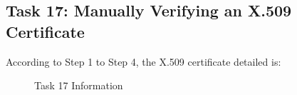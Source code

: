 \documentclass[a4paper]{article}
\begin{document}
\subsection{Task 17: Manually Verifying an X.509 Certificate}
According to Step 1 to Step 4, the X.509 certificate detailed is:
\begin{figure}[h]
    \centering
    \hfill
    \hfill
    \hfill
    \hfill
    \caption{Task 17 Information}\label{fig:task17}
\end{figure}
\end{document}
